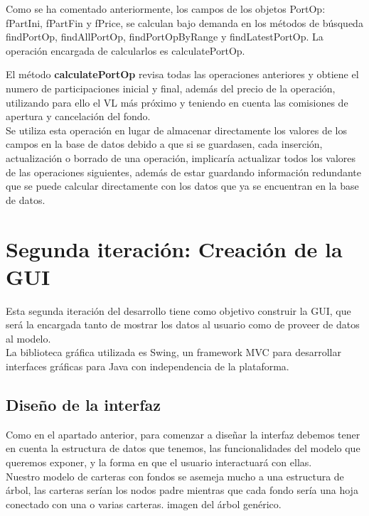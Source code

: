 \documentclass[12pt, a4paper]{article}
\begin{document}
Como se ha comentado anteriormente, los campos de los objetos PortOp:  fPartIni, fPartFin y fPrice, se calculan bajo demanda en los métodos de búsqueda findPortOp, findAllPortOp, findPortOpByRange y findLatestPortOp. La operación encargada de calcularlos es calculatePortOp.\\

\newpage

El método \textbf{calculatePortOp} revisa todas las operaciones anteriores y obtiene el numero de participaciones inicial y final, además del precio de la operación, utilizando para ello el \gls{VL} más próximo y teniendo en cuenta las comisiones de apertura y cancelación del fondo.\\

Se utiliza esta operación en lugar de almacenar directamente los valores de los campos en la base de datos debido a que si se guardasen, cada inserción, actualización o borrado de una operación, implicaría actualizar todos los valores de las operaciones siguientes, además de estar guardando información redundante que se puede calcular directamente con los datos que ya se encuentran en la base de datos.



\newpage
\section{Segunda iteración: Creación de la GUI}

Esta segunda iteración del desarrollo tiene como objetivo construir la \gls{GUI}, que será la encargada tanto de mostrar los datos al usuario como de proveer de datos al modelo.
\\

La biblioteca gráfica utilizada es Swing, un framework MVC para desarrollar interfaces gráficas para Java con independencia de la plataforma.

\subsection{Diseño de la interfaz}

Como en el apartado anterior, para comenzar a diseñar la interfaz debemos tener en cuenta la estructura de datos que tenemos, las funcionalidades del modelo que queremos exponer, y la forma en que el usuario interactuará con ellas.
\\

Nuestro modelo de carteras con fondos se asemeja mucho a una estructura de árbol, las carteras serían los nodos padre mientras que cada fondo sería una hoja conectado con una o varias carteras. imagen del árbol genérico.
\\
\end{document}
